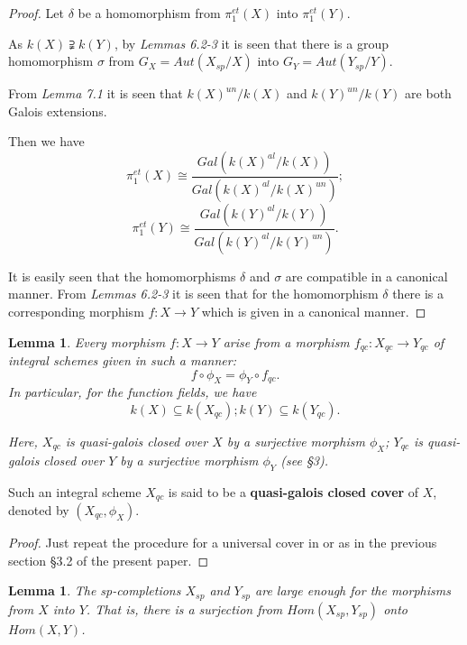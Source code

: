 \documentclass[12pt,twoside,reqno]{amsart}
\newtheorem{lemma}[theorem]{Lemma}
\theoremstyle{definition}
\numberwithin{equation}{section}
\begin{document}
\begin{proof}
Let $\delta $ be a homomorphism from $\pi_{1}^{et}(X)$ into $ \pi_{1}^{et}(Y)$.

As $k(X) \supsetneqq k(Y)$, by \emph{Lemmas 6.2-3} it is seen that there is a group homomorphism $\sigma$ from $G_{X}=Aut(X_{sp}/X)$ into $G_{Y}=Aut(Y_{sp}/Y)$.

From \emph{Lemma 7.1} it is seen that $k(X)^{un}/k(X)$ and $k(Y)^{un}/k(Y)$ are both Galois extensions.

Then we have
$$\pi_{1}^{et}(X)\cong \frac {Gal(k(X)^{al}/k(X))} {Gal(k(X)^{al}/k(X)^{un})};$$
$$\pi_{1}^{et}(Y)\cong \frac {Gal(k(Y)^{al}/k(Y))} {Gal(k(Y)^{al}/k(Y)^{un})}.$$

It is easily seen that the homomorphisms $\delta$ and $\sigma$ are compatible in a canonical manner.
From \emph{Lemmas 6.2-3} it is seen that for the homomorphism $\delta$ there is a corresponding morphism $f:X \to Y$ which is given in a canonical manner.
\end{proof}

\begin{lemma}
Every morphism $f:X\to Y$ arise from a morphism $f_{qc}:X_{qc}\to Y_{qc}$ of integral schemes given in such a manner:
$$f\circ \phi_{X}=\phi_{Y}\circ f_{qc}.$$
In particular, for the function fields, we have $$k(X) \subseteq k(X_{qc}); k(Y) \subseteq k(Y_{qc}).$$

 Here, $X_{qc}$ is quasi-galois closed over $X$ by a surjective morphism $\phi_{X}$; $Y_{qc}$ is quasi-galois closed over $Y$ by a surjective morphism $\phi_{Y}$ \emph{(see} \S 3\emph{)}.
\end{lemma}

Such an integral scheme $X_{qc}$ is said to be a \textbf{quasi-galois closed cover} of $X$, denoted by $(X_{qc},\phi_{X})$.

\begin{proof}
Just repeat the procedure for a universal cover in \cite{An3} or as in the previous section \S 3.2 of the present paper.
\end{proof}

\begin{lemma}
The \emph{sp}-completions $X_{sp}$ and $Y_{sp}$ are large enough for the morphisms from $X$ into $Y$. That is, there is a surjection from $Hom(X_{sp},Y_{sp})$ onto $Hom(X,Y)$.
\end{lemma}
\end{document}
